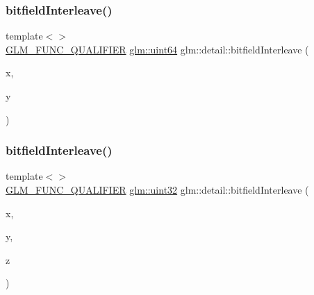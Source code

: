 \mbox{\label{namespaceglm_1_1detail_a7f40bc91b3d293fae0f7df8de85cdcc6}} 
\subsubsection{\texorpdfstring{bitfield\+Interleave()}{bitfieldInterleave()}\hspace{0.1cm}{\footnotesize\ttfamily [6/11]}}
{\footnotesize\ttfamily template$<$$>$ \\
\mbox{\hyperlink{setup_8hpp_a33fdea6f91c5f834105f7415e2a64407}{G\+L\+M\+\_\+\+F\+U\+N\+C\+\_\+\+Q\+U\+A\+L\+I\+F\+I\+ER}} \mbox{\hyperlink{group__gtc__type__precision_gae3632bf9b37da66233d78930dd06378a}{glm\+::uint64}} glm\+::detail\+::bitfield\+Interleave (\begin{DoxyParamCaption}\item[{\mbox{\hyperlink{group__gtc__type__precision_ga202b6a53c105fcb7e531f9b443518451}{glm\+::uint32}}}]{x,  }\item[{\mbox{\hyperlink{group__gtc__type__precision_ga202b6a53c105fcb7e531f9b443518451}{glm\+::uint32}}}]{y }\end{DoxyParamCaption})}

\mbox{\label{namespaceglm_1_1detail_a27e9c62ce3ad180236573daec6a6461f}} 
\subsubsection{\texorpdfstring{bitfield\+Interleave()}{bitfieldInterleave()}\hspace{0.1cm}{\footnotesize\ttfamily [7/11]}}
{\footnotesize\ttfamily template$<$$>$ \\
\mbox{\hyperlink{setup_8hpp_a33fdea6f91c5f834105f7415e2a64407}{G\+L\+M\+\_\+\+F\+U\+N\+C\+\_\+\+Q\+U\+A\+L\+I\+F\+I\+ER}} \mbox{\hyperlink{group__gtc__type__precision_ga202b6a53c105fcb7e531f9b443518451}{glm\+::uint32}} glm\+::detail\+::bitfield\+Interleave (\begin{DoxyParamCaption}\item[{\mbox{\hyperlink{group__gtc__type__precision_ga1a7dcd8aac97cc8020817c94049deff2}{glm\+::uint8}}}]{x,  }\item[{\mbox{\hyperlink{group__gtc__type__precision_ga1a7dcd8aac97cc8020817c94049deff2}{glm\+::uint8}}}]{y,  }\item[{\mbox{\hyperlink{group__gtc__type__precision_ga1a7dcd8aac97cc8020817c94049deff2}{glm\+::uint8}}}]{z }\end{DoxyParamCaption})}

